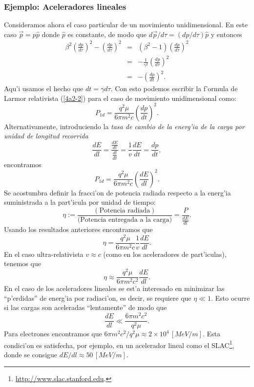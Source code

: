 \subsubsection{Ejemplo: Aceleradores lineales}
Consideramos ahora el caso particular de un movimiento unidimensional. En este
caso $\vec{p}=p\hat{p}$ donde $\hat{p}$ es constante, de modo que
${d\vec{p}}/{d\tau}=({dp}/{d\tau})\hat{p}$ y entonces
\begin{eqnarray}
\beta^2\left(\frac{dp}{d\tau}\right)^2-\left( \frac{dp}{d\tau}\right)^2
&=&\left( \beta^2-1\right) \left(  \frac{dp}{d\tau}\right)^2\\
&=&-\frac{1}{\gamma^2} \left(  \frac{dp}{d\tau}\right)^2\\
&=&-\left(\frac{dp}{dt}\right)^2.
\end{eqnarray}
Aqu'i usamos el hecho que $dt=\gamma d\tau$. Con esto podemos escribir la f'ormula de Larmor relativista (\ref{4a2-2}) para el caso de movimiento unidimensional como:
\begin{equation}
\boxed{P_{1d}=\frac{q^2\mu}{6\pi m^2c}\left(  \frac{dp}{dt}\right)^2.}
\end{equation}
Alternativamente, introduciendo la \textit{tasa de cambio de la energ'ia de la
carga por unidad de longitud recorrida}
\begin{equation}
 \frac{dE}{dl}=\frac{\frac{dE}{dt}}{\frac{dl}{dt}}=\frac{1}{v}\frac{dE}{dt}
= \frac{dp}{dt},
\end{equation}
encontramos
\begin{equation}
\boxed{P_{1d}=\frac{q^2\mu}{6\pi m^2c}\left(  \frac{dE}{dl}\right)^2.}
\end{equation}
Se acostumbra definir la fracci'on de potencia radiada respecto a la energ'ia
suministrada a la part'icula por unidad de tiempo:
\begin{equation}
\eta:=\frac{\left( \text{Potencia radiada}\right) }{\text{(Potencia entregada a la carga)}}=\frac{P}{\frac{dE}{dt}}.
\end{equation}
Usando los resultados anteriores encontramos que
\begin{equation}
\eta=\frac{q^2\mu}{6\pi m^2c}\frac{1}{v}\frac{dE}{dl}.
\end{equation}
En el caso ultra-relativista $v\approx c$ (como en los aceleradores de
part'iculas), tenemos que
\begin{equation}
\eta\approx\frac{q^2\mu}{6\pi m^2c^2}\frac{dE}{dl}.
\end{equation}
En el caso de los aceleradores lineales se est'a interesado en minimizar las
``p'erdidas'' de energ'ia por radiaci'on, es decir, se requiere que $\eta\ll 1$.
Esto ocurre si las cargas son aceleradas ``lentamente'' de modo que
\begin{equation}
\frac{dE}{dl}\ll \frac{6\pi m^2c^2}{q^2\mu}.
\end{equation}
Para electrones encontramos que ${6\pi m^2c^2}/{q^2\mu}\approx 2\times 10^4\, 
[MeV/m]$. Esta condici'on es satisfecha, por ejemplo, en un acelerador lineal como
el SLAC\footnote{\url{http://www.slac.stanford.edu}.}, donde se consigue
${dE}/{dl}\approx 50\, [MeV/m]$.

